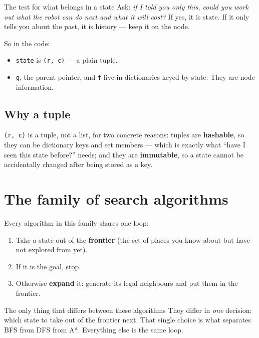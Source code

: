 \documentclass[11pt,a4paper]{article}
\begin{document}
\begin{keyidea}{The test for what belongs in a state}
Ask: \emph{if I told you only this, could you work out what the robot can do next
and what it will cost?} If yes, it is state. If it only tells you about the past,
it is history --- keep it on the node.
\end{keyidea}

So in the code:
\begin{itemize}
  \item \texttt{state} is \texttt{(r, c)} --- a plain tuple.
  \item \texttt{g}, the parent pointer, and \texttt{f} live in dictionaries keyed
        by state. They are node information.
\end{itemize}

\subsection{Why a tuple}

\texttt{(r, c)} is a tuple, not a list, for two concrete reasons: tuples are
\textbf{hashable}, so they can be dictionary keys and set members --- which is
exactly what ``have I seen this state before?'' needs; and they are
\textbf{immutable}, so a state cannot be accidentally changed after being stored
as a key.

\section{The family of search algorithms}

Every algorithm in this family shares one loop:

\begin{enumerate}
  \item Take a state out of the \textbf{frontier} (the set of places you know
        about but have not explored from yet).
  \item If it is the goal, stop.
  \item Otherwise \textbf{expand} it: generate its legal neighbours and put them
        in the frontier.
\end{enumerate}

\begin{keyidea}{The only thing that differs between these algorithms}
They differ in \emph{one} decision: which state to take out of the frontier next.
That single choice is what separates BFS from DFS from A*. Everything else is the
same loop.
\end{keyidea}
\end{document}
